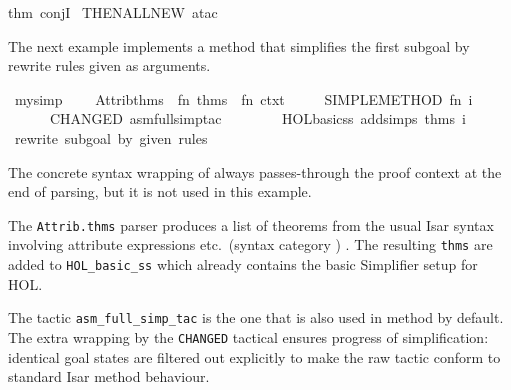 \begin{isabellebody}
\isaantiq
thm\ conjI%
\endisaantiq
\ THEN{\isacharunderscore}ALL{\isacharunderscore}NEW\ atac{\isacharparenright}\ {}\ {\isacharverbatimclose}{\isacharparenright}\isanewline
\ \ \ \ \isamarkupfalse%
\isanewline
{}\isamarkupfalse%
%
\endisatagproof
{\isafoldproof}%
%
\isadelimproof
%
\endisadelimproof
%
\begin{isamarkuptext}%
\medskip The next example implements a method that simplifies
  the first subgoal by rewrite rules given as arguments.%
\end{isamarkuptext}%
\isamarkuptrue%
%
\isadelimML
%
\endisadelimML
%
\isatagML
{}\isamarkupfalse%
\ my{\isacharunderscore}simp\ {\isacharequal}\ {\isacharverbatimopen}\isanewline
\ \ Attrib{\isachardot}thms\ {\isachargreater}{\isachargreater}\ {\isacharparenleft}fn\ thms\ {\isacharequal}{\isachargreater}\ fn\ ctxt\ {\isacharequal}{\isachargreater}\isanewline
\ \ \ \ SIMPLE{\isacharunderscore}METHOD{\isacharprime}\ {\isacharparenleft}fn\ i\ {\isacharequal}{\isachargreater}\isanewline
\ \ \ \ \ \ CHANGED\ {\isacharparenleft}asm{\isacharunderscore}full{\isacharunderscore}simp{\isacharunderscore}tac\isanewline
\ \ \ \ \ \ \ \ {\isacharparenleft}HOL{\isacharunderscore}basic{\isacharunderscore}ss\ addsimps\ thms{\isacharparenright}\ i{\isacharparenright}{\isacharparenright}{\isacharparenright}\isanewline
{\isacharverbatimclose}\ {\isachardoublequoteopen}rewrite\ subgoal\ by\ given\ rules{\isachardoublequoteclose}%
\endisatagML
{\isafoldML}%
%
\isadelimML
%
\endisadelimML
%
\begin{isamarkuptext}%
The concrete syntax wrapping of \hyperlink{command.method-setup}{\mbox{}} always
  passes-through the proof context at the end of parsing, but it is
  not used in this example.

  The \verb|Attrib.thms| parser produces a list of theorems from the
  usual Isar syntax involving attribute expressions etc.\ (syntax
  category \hyperlink{syntax.thmrefs}{\mbox{}}) \cite{isabelle-isar-ref}.  The resulting
  \verb|thms| are added to \verb|HOL_basic_ss| which already
  contains the basic Simplifier setup for HOL.

  The tactic \verb|asm_full_simp_tac| is the one that is also used in
  method \hyperlink{method.simp}{\mbox{}} by default.  The extra wrapping by the \verb|CHANGED| tactical ensures progress of simplification: identical goal
  states are filtered out explicitly to make the raw tactic conform to
  standard Isar method behaviour.


\end{isamarkuptext}
\end{isabellebody}

